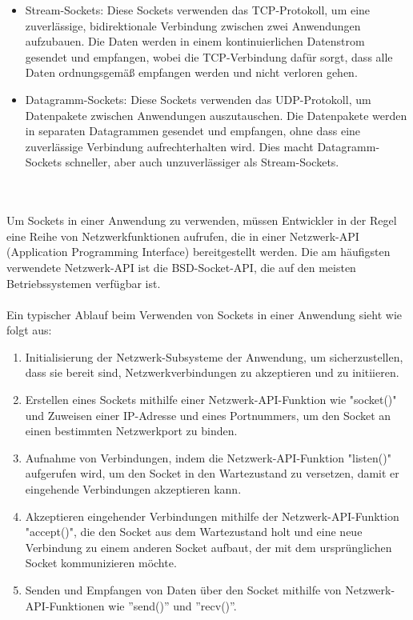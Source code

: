 \documentclass[german,oneside,color]{htldipl}
\begin{document}
\begin{itemize}
    \item Stream-Sockets: Diese Sockets verwenden das TCP-Protokoll, um eine zuverlässige, bidirektionale Verbindung zwischen zwei Anwendungen aufzubauen. Die Daten werden in einem kontinuierlichen Datenstrom gesendet und empfangen, wobei die TCP-Verbindung dafür sorgt, dass alle Daten ordnungsgemäß empfangen werden und nicht verloren gehen.
    
    \item Datagramm-Sockets: Diese Sockets verwenden das UDP-Protokoll, um Datenpakete zwischen Anwendungen auszutauschen. Die Datenpakete werden in separaten Datagrammen gesendet und empfangen, ohne dass eine zuverlässige Verbindung aufrechterhalten wird. Dies macht Datagramm-Sockets schneller, aber auch unzuverlässiger als Stream-Sockets.
\end{itemize}
\\
\\
Um Sockets in einer Anwendung zu verwenden, müssen Entwickler in der Regel eine Reihe von Netzwerkfunktionen aufrufen, die in einer Netzwerk-API (Application Programming Interface) bereitgestellt werden. Die am häufigsten verwendete Netzwerk-API ist die BSD-Socket-API, die auf den meisten Betriebssystemen verfügbar ist.
\\
\\
Ein typischer Ablauf beim Verwenden von Sockets in einer Anwendung sieht wie folgt aus:
\begin{enumerate}
    \item Initialisierung der Netzwerk-Subsysteme der Anwendung, um sicherzustellen, dass sie bereit sind, Netzwerkverbindungen zu akzeptieren und zu initiieren.
    \item Erstellen eines Sockets mithilfe einer Netzwerk-API-Funktion wie "socket()" und Zuweisen einer IP-Adresse und eines Portnummers, um den Socket an einen bestimmten Netzwerkport zu binden.
    \item Aufnahme von Verbindungen, indem die Netzwerk-API-Funktion "listen()" aufgerufen wird, um den Socket in den Wartezustand zu versetzen, damit er eingehende Verbindungen akzeptieren kann.
    \item Akzeptieren eingehender Verbindungen mithilfe der Netzwerk-API-Funktion "accept()", die den Socket aus dem Wartezustand holt und eine neue Verbindung zu einem anderen Socket aufbaut, der mit dem ursprünglichen Socket kommunizieren möchte.
    \item Senden und Empfangen von Daten über den Socket mithilfe von Netzwerk-API-Funktionen wie ''send()'' und ''recv()''.
\end{enumerate}
\end{document}
